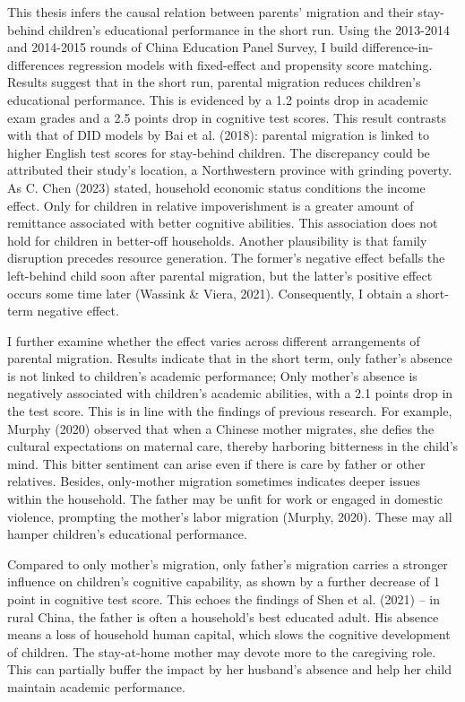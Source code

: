 \documentclass[
  man,floatsintext]{apa7}
\begin{document}
This thesis infers the causal relation between parents' migration and their stay-behind children's educational performance in the short run. Using the 2013-2014 and 2014-2015 rounds of China Education Panel Survey, I build difference-in-differences regression models with fixed-effect and propensity score matching. Results suggest that in the short run, parental migration reduces children's educational performance. This is evidenced by a 1.2 points drop in academic exam grades and a 2.5 points drop in cognitive test scores. This result contrasts with that of DID models by Bai et al. (2018): parental migration is linked to higher English test scores for stay-behind children. The discrepancy could be attributed their study's location, a Northwestern province with grinding poverty. As C. Chen (2023) stated, household economic status conditions the income effect. Only for children in relative impoverishment is a greater amount of remittance associated with better cognitive abilities. This association does not hold for children in better-off households. Another plausibility is that family disruption precedes resource generation. The former's negative effect befalls the left-behind child soon after parental migration, but the latter's positive effect occurs some time later (Wassink \& Viera, 2021). Consequently, I obtain a short-term negative effect.

I further examine whether the effect varies across different arrangements of parental migration. Results indicate that in the short term, only father's absence is not linked to children's academic performance; Only mother's absence is negatively associated with children's academic abilities, with a 2.1 points drop in the test score. This is in line with the findings of previous research. For example, Murphy (2020) observed that when a Chinese mother migrates, she defies the cultural expectations on maternal care, thereby harboring bitterness in the child's mind. This bitter sentiment can arise even if there is care by father or other relatives. Besides, only-mother migration sometimes indicates deeper issues within the household. The father may be unfit for work or engaged in domestic violence, prompting the mother's labor migration (Murphy, 2020). These may all hamper children's educational performance.

Compared to only mother's migration, only father's migration carries a stronger influence on children's cognitive capability, as shown by a further decrease of 1 point in cognitive test score. This echoes the findings of Shen et al. (2021) -- in rural China, the father is often a household's best educated adult. His absence means a loss of household human capital, which slows the cognitive development of children. The stay-at-home mother may devote more to the caregiving role. This can partially buffer the impact by her husband's absence and help her child maintain academic performance.
\end{document}
